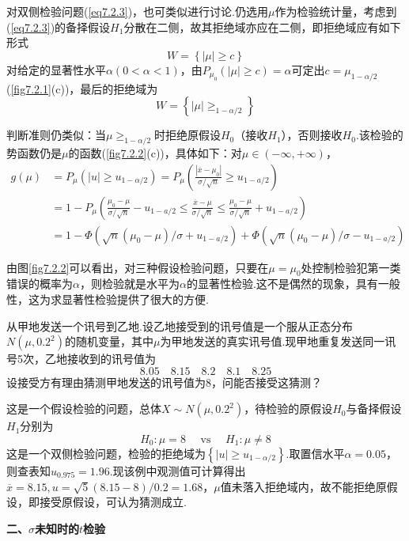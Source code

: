 对双侧检验问题(\ref{eq7.2.3})，也可类似进行讨论.仍选用$\mu$作为检验统计量，考虑到(\ref{eq7.2.3})的备择假设$H_{1}$分散在二侧，故其拒绝域亦应在二侧，即拒绝域应有如下形式
\[W=\left\{\left|\mu\right|\geq c\right\}\]
对给定的显著性水平$\alpha(0<\alpha<1)$，由$P_{\mu_0}\left(\left|\mu\right|\geq c\right)=\alpha $可定出$c=\mu_{1-\alpha/2}$(\ref{fig7.2.1}(c))，最后的拒绝域为
\begin{equation}\label{eq7.2.8}
W=\left\{\left|\mu\right|\geq_{1-\alpha/2}\right\}
\end{equation}

判断准则仍类似：当$\mu\geq_{1-\alpha/2}$时拒绝原假设$H_{0}$（接收$H_{1}$），否则接收$H_{0}$.该检验的势函数仍是$\mu $的函数(\ref{fig7.2.2}(c))，具体如下：对$\mu \in (-\infty,+\infty)$，
\begin{align*}
	g ( \mu ) &= P _ { \mu } \left( | u | \geq u _ { 1 - \alpha / 2 } \right) = P _ { \mu } \left( \frac { \left| \overline { x } - \mu _ { 0 } \right| } { \sigma / \sqrt { n } } \geq u _ { 1 - a / 2 } \right)\\
	&=1-P_{\mu}\left(\frac{\mu_0-\mu}{\sigma/\sqrt{n}}-u_{1-a/2}\le\frac{\overline{x}-\mu}{\sigma/\sqrt{n}}\le\frac{\mu_0-\mu}{\sigma/\sqrt{n}}+u_{1-a/2}\right)\\
	&= 1 - \Phi \left( \sqrt { n } \left( \mu _ { 0 } - \mu \right) / \sigma + u _ { 1 - a / 2 } \right) + \Phi \left( \sqrt { n } \left( \mu _ { 0 } - \mu \right) / \sigma - u _ { 1 - a / 2 } \right)
\end{align*}

由图\ref{fig7.2.2}可以看出，对三种假设检验问题，只要在$\mu=\mu_{ 0 }$处控制检验犯第一类错误的概率为$\alpha$，则检验就是水平为$\alpha$的显著性检验.这不是偶然的现象，具有一般性，这为求显著性检验提供了很大的方便.

\begin{example}\label{exam7.2.1}
从甲地发送一个讯号到乙地.设乙地接受到的讯号值是一个服从正态分布$N(\mu ,0.2^{2})$的随机变量，其中$\mu $为甲地发送的真实讯号值.现甲地重复发送同一讯号5次，乙地接收到的讯号值为
\[8.05 \quad 8.15 \quad 8.2 \quad 8.1 \quad 8.25\]
设接受方有理由猜测甲地发送的讯号值为8，问能否接受这猜测？
\end{example}
\begin{solution}
	这是一个假设检验的问题，总体$X \sim N \left( \mu , 0.2 ^ { 2 } \right)$，待检验的原假设$H_{0}$与备择假设$H_{1}$分别为
	\[H _ { 0 } : \mu = 8 \quad \text { vs } \quad H _ { 1 } : \mu \neq 8\]
	这是一个双侧检验问题，检验的拒绝域为$\left\{ | u | \geq u _ { 1 - \alpha / 2} \right\}$.取置信水平$\alpha=0.05$，则查表知$u_{0.975}=1.96$.现该例中观测值可计算得出$\overline{x}=8.15,u=\sqrt{5}\left(8.15-8\right)/0.2=1.68$，$\mu $值未落入拒绝域内，故不能拒绝原假设，即接受原假设，可认为猜测成立.
	
\end{solution}
\textbf{二、$\sigma$未知时的$t$检验}

